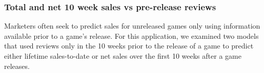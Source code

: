 \documentclass{sig-alternate}
\begin{document}



\subsubsection{Total and net 10 week sales vs pre-release reviews}
Marketers often seek to predict sales for unreleased games only using information available prior to a game's release. For this application, we examined two models that used reviews only in the 10 weeks prior to the release of a game to predict either lifetime sales-to-date or net sales over the first 10 weeks after a game releases.
\end{document}
